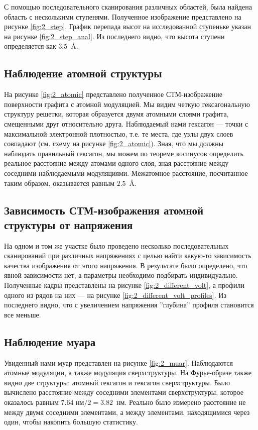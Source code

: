 \documentclass[a4paper, 12pt]{article}
\begin{document}
	С помощью последовательного сканирования различных областей, была найдена область с несколькими ступенями. Полученное изображение представлено на рисунке \ref{fig:2_step}. График перепада высот на исследованной ступеньке указан на рисунке \ref{fig:2_step_anal}. Из последнего видно, что высота ступени определяется как $3.5$~\AA.
	
	\subsection{Наблюдение атомной структуры}
	
	На рисунке \ref{fig:2_atomic} представлено полученное СТМ-изображение поверхности графита с атомной модуляцией. Мы видим четкую гексагональную структуру решетки, которая образуется двумя атомными слоями графита, смещенными друг относительно друга. Наблюдаемый нами гексагон --- точки с максимальной электронной плотностью, т.е. те места, где узлы двух слоев совпадают (см. схему на рисунке \ref{fig:2_atomic}). Зная, что мы должны наблюдать правильный гексагон, мы можем по теореме косинусов определить реальное расстояние между атомами одного слоя, зная расстояние между соседними наблюдаемыми модуляциями. Межатомное расстояние, посчитанное таким образом, оказывается равным $2.5$~\AA. 
	
	
	
	\subsection{Зависимость СТМ-изображения атомной структуры от напряжения}
	
	На одном и том же участке было проведено несколько последовательных сканирований при различных напряжениях с целью найти какую-то зависимость качества изображения от этого напряжения. В результате было определено, что явной зависимости нет, а параметры необходимо подбирать индивидуально. Полученные кадры представлены на рисунке \ref{fig:2_different_volt}, а профили одного из рядов на них --- на рисунке \ref{fig:2_different_volt_profiles}. Из последнего видно, что с увеличением напряжения ''глубина'' профиля становится все меньше.
	
	\subsection{Наблюдение муара}
	
	Увиденный нами муар представлен на рисунке \ref{fig:2_muar}. Наблюдаются атомные модуляции, а также модуляция сверхструктуры. На Фурье-образе также видно две структуры: атомный гексагон и гексагон сверхструктуры. Было вычислено расстояние между соседними элементами сверхструктуры, которое оказалось равным $7.64\text{ нм}/2 = 3.82$~нм. Реально было измерено расстояние не между двумя соседними элементами, а между элементами, находящимися через один, чтобы накопить большую статистику.
	
\end{document}

